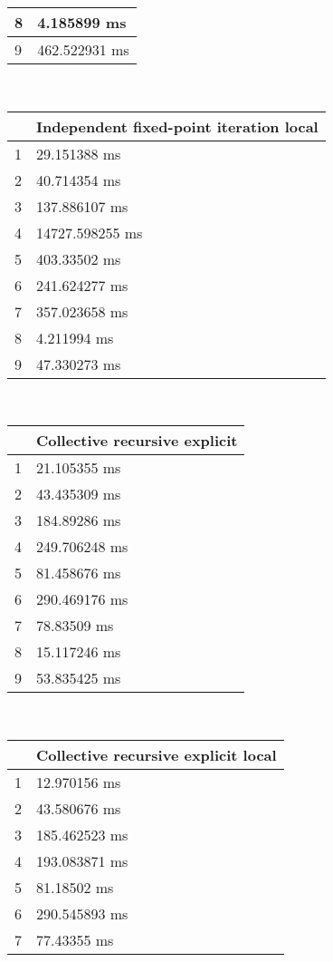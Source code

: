 \begin{multicols}{2}
\begin{tabular}{|l|l|}
		8 & 4.185899 ms \\ \hline
		9 & 462.522931 ms \\ \hline
	\end{tabular}\\
	\begin{tabular}{|l|l|}
		\hline
		& Independent fixed-point iteration local \\ \hline
		1 & 29.151388 ms \\ \hline
		2 & 40.714354 ms \\ \hline
		3 & 137.886107 ms \\ \hline
		4 & 14727.598255 ms \\ \hline
		5 & 403.33502 ms \\ \hline
		6 & 241.624277 ms \\ \hline
		7 & 357.023658 ms \\ \hline
		8 & 4.211994 ms \\ \hline
		9 & 47.330273 ms \\ \hline
	\end{tabular}\\
	\begin{tabular}{|l|l|}
		\hline
		& Collective recursive explicit \\ \hline
		1 & 21.105355 ms \\ \hline
		2 & 43.435309 ms \\ \hline
		3 & 184.89286 ms \\ \hline
		4 & 249.706248 ms \\ \hline
		5 & 81.458676 ms \\ \hline
		6 & 290.469176 ms \\ \hline
		7 & 78.83509 ms \\ \hline
		8 & 15.117246 ms \\ \hline
		9 & 53.835425 ms \\ \hline
	\end{tabular}\\
	\begin{tabular}{|l|l|}
		\hline
		& Collective recursive explicit local \\ \hline
		1 & 12.970156 ms \\ \hline
		2 & 43.580676 ms \\ \hline
		3 & 185.462523 ms \\ \hline
		4 & 193.083871 ms \\ \hline
		5 & 81.18502 ms \\ \hline
		6 & 290.545893 ms \\ \hline
		7 & 77.43355 ms \\ \hline

\end{tabular}
\end{multicols}
